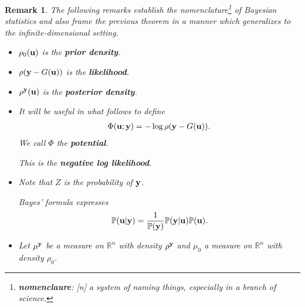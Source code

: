 \documentclass[oneside,11pt]{book}
\numberwithin{equation}{section}
\newtheorem{remark}{Remark}[section]
\begin{document}
\begin{remark}
    The following remarks establish the nomenclature\footnote{\textbf{nomenclaure}: [n] a system of naming things, especially in a branch of science.} of Bayesian statistics and also frame the previous theorem in a manner which generalizes to the infinite-dimensional setting.
    \begin{itemize}
        \item $\rho_0({\bf u})$ is the \textbf{prior density}.
        \item $\rho({\bf y} - G({\bf u}))$ is the \textbf{likelihood}.
        \item $\rho^{\bf y}({\bf u})$ is the \textbf{posterior density}.
        \item It will be useful in what follows to define
        \begin{align*}
            \Phi({\bf u};{\bf y}) = -\log\rho({\bf y} - G({\bf u})).
        \end{align*}
        We call $\Phi$ the \textbf{potential}.
        
        This is the \textbf{negative log likelihood}.
        \item Note that $Z$ is the probability of ${\bf y}$.
        
        Bayes' formula expresses
        \begin{align*}
            \mathbb{P}({\bf u}|{\bf y}) = \frac{1}{\mathbb{P}({\bf y})}\mathbb{P}({\bf y}|{\bf u})\mathbb{P}({\bf u}).
        \end{align*}
        \item Let $\mu^{\bf y}$ be a measure on $\mathbb{R}^n$ with density $\rho^{\bf y}$ and $\mu_0$ a measure on $\mathbb{R}^n$ with density $\rho_0$.
        

\end{itemize}
\end{remark}
\end{document}
